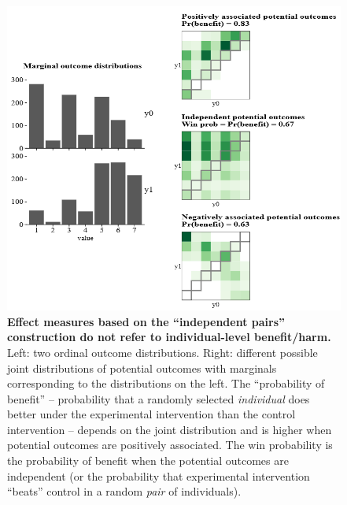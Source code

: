 \documentclass[
  11pt,
  fleqn
]{article}
\begin{document}
\begin{figure}
  \includegraphics[width=5in]{po_association_discrete.png}
  \caption{\textbf{Effect measures based on the ``independent pairs''
    construction do not refer to individual-level benefit/harm.}
    Left: two ordinal outcome distributions. Right: different
    possible joint distributions of potential outcomes with marginals
    corresponding to the distributions on the left.
    The ``probability of benefit'' -- probability that a randomly
    selected \emph{individual} does better under the experimental
    intervention than the control intervention -- depends on the
    joint distribution and is higher when potential outcomes are
    positively associated. The win probability is the probability of
    benefit when the potential outcomes are independent (or the
      probability that experimental intervention ``beats'' control in a
    random \emph{pair} of individuals).
  }
  \label{fig:pairwise_and_pos_discrete}
\end{figure}
\end{document}
